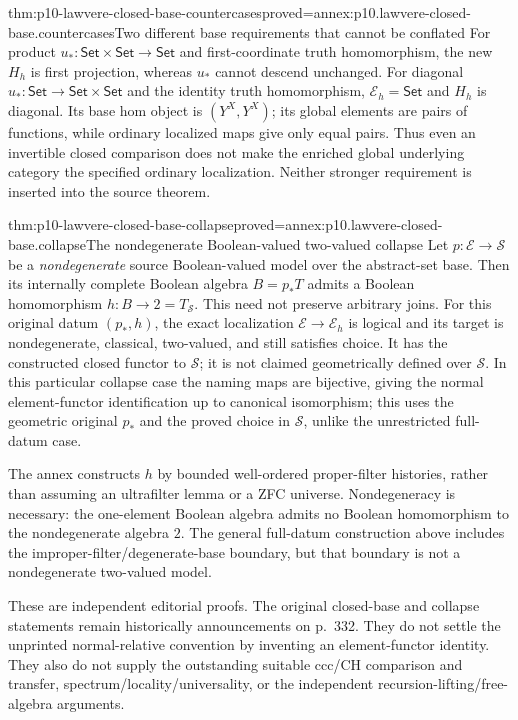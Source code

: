 \begin{hblemma}{thm:p10-lawvere-closed-base-countercases}{proved=annex:p10.lawvere-closed-base.countercases}{Two different base requirements that cannot be conflated}
For product \(u_*:\mathsf{Set}\times\mathsf{Set}\to\mathsf{Set}\)
and first-coordinate truth homomorphism, the new \(H_h\) is first
projection, whereas \(u_*\) cannot descend unchanged.
For diagonal \(u_*:\mathsf{Set}\to\mathsf{Set}\times\mathsf{Set}\)
and the identity truth homomorphism, \(\mathcal E_h=\mathsf{Set}\)
and \(H_h\) is diagonal. Its base hom object is
\((Y^X,Y^X)\); its global elements are pairs of functions, while
ordinary localized maps give only equal pairs. Thus even an invertible
closed comparison does not make the enriched global underlying category
the specified ordinary localization. Neither stronger requirement is
inserted into the source theorem.
\end{hblemma}

\begin{hbtheorem}{thm:p10-lawvere-closed-base-collapse}{proved=annex:p10.lawvere-closed-base.collapse}{The nondegenerate Boolean-valued two-valued collapse}
Let \(p:\mathcal E\to\mathcal S\) be a \emph{nondegenerate}
source Boolean-valued model over the abstract-set base. Then its internally
complete Boolean algebra \(B=p_*T\) admits a Boolean homomorphism
\(h:B\to2=T_{\mathcal S}\). This need not preserve arbitrary joins.
For this original datum \((p_*,h)\), the exact localization
\(\mathcal E\to\mathcal E_h\) is logical and its target is
nondegenerate, classical, two-valued, and still satisfies choice.
It has the constructed closed functor to \(\mathcal S\); it is
not claimed geometrically defined over \(\mathcal S\). In this
particular collapse case the naming maps are bijective, giving the
normal element-functor identification up to canonical isomorphism;
this uses the geometric original \(p_*\) and the proved choice
in \(\mathcal S\), unlike the unrestricted full-datum case.

The annex constructs \(h\) by bounded well-ordered proper-filter
histories, rather than assuming an ultrafilter lemma or a ZFC universe.
Nondegeneracy is necessary: the one-element Boolean algebra admits no
Boolean homomorphism to the nondegenerate algebra \(2\). The general
full-datum construction above includes the improper-filter/degenerate-base
boundary, but that boundary is not a nondegenerate two-valued model.
\end{hbtheorem}

These are independent editorial proofs. The original closed-base and
collapse statements remain historically announcements on p.~332. They
do not settle the unprinted normal-relative convention by inventing an
element-functor identity. They also do not supply the outstanding suitable
ccc/CH comparison and transfer, spectrum/locality/universality, or the
independent recursion-lifting/free-algebra arguments.
